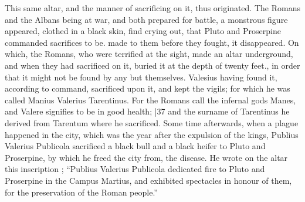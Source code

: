 This same altar, and the manner of sacrificing on it, thus originated. The Romans and the Albans being at war, and both prepared for battle, a monstrous figure appeared, clothed in a black skin, find crying out, that Pluto and Proserpine commanded sacrifices to be. made to them before they fought, it disappeared. On which, the Romans, who were terrified at the sight, made an altar underground, and when they had sacrificed on it, buried it at the depth of twenty feet., in order that it might not be found by any but themselves. Valesius having found it, according to command, sacrificed upon it, and kept the vigils; for which he was called Manius Valerius Tarentinus. For the Romans call the infernal gods Manes, and Valere signifies to be in good health;
|37 and the surname of Tarentinus he derived from Tarentum where he sacrificed. Some time afterwards, when a plague happened in the city, which was the year after the expulsion of the kings, Publius Valerius Publicola sacrificed a black bull and a black heifer to Pluto and Proserpine, by which he freed the city from, the disease. He wrote on the altar this inscription ; ``Publius Valerius Publicola dedicated fire to Pluto and Proserpine in the Campus Martius, and exhibited spectacles in honour of them, for the preservation of the Roman
people.''

